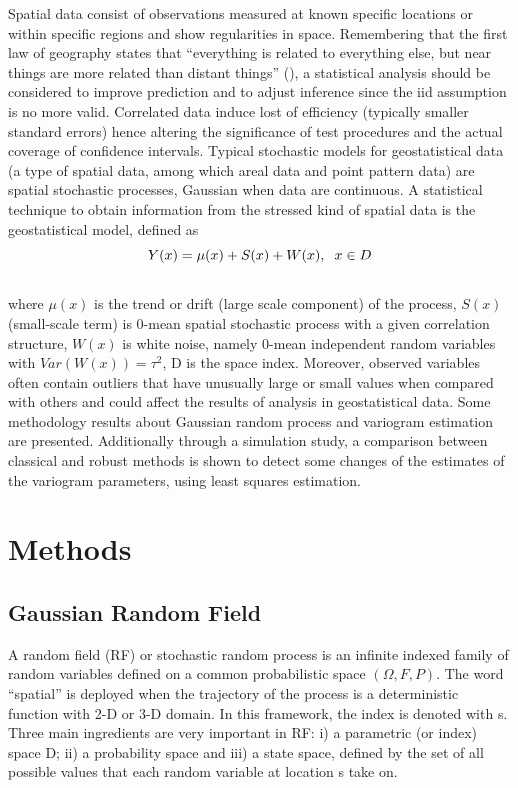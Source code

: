 \documentclass[
  12pt]{article}
\begin{document}
Spatial data consist of observations measured at known specific
locations or within specific regions and show regularities in space.
Remembering that the first law of geography states that ``everything is
related to everything else, but near things are more related than
distant things'' (\citet{tob:1969}), a statistical analysis should be
considered to improve prediction and to adjust inference since the iid
assumption is no more valid. Correlated data induce lost of efficiency
(typically smaller standard errors) hence altering the significance of
test procedures and the actual coverage of confidence intervals. Typical
stochastic models for geostatistical data (a type of spatial data, among
which areal data and point pattern data) are spatial stochastic
processes, Gaussian when data are continuous. A statistical technique to
obtain information from the stressed kind of spatial data is the
geostatistical model, defined as\\
\[Y(x)=\mu(x)+S(x)+W(x), \hspace{2mm} x\in D\]\\
where \(\mu(x)\) is the trend or drift (large scale component) of the
process, \(S(x)\) (small-scale term) is 0-mean spatial stochastic
process with a given correlation structure, \(W(x)\) is white noise,
namely 0-mean independent random variables with \(Var(W(x))=\tau^2\), D
is the space index. Moreover, observed variables often contain outliers
that have unusually large or small values when compared with others and
could affect the results of analysis in geostatistical data. Some
methodology results about Gaussian random process and variogram
estimation are presented. Additionally through a simulation study, a
comparison between classical and robust methods is shown to detect some
changes of the estimates of the variogram parameters, using least
squares estimation.

\section{Methods}\label{methods}

\subsection{Gaussian Random Field}\label{gaussian-random-field}

A random field (RF) or stochastic random process is an infinite indexed
family of random variables defined on a common probabilistic space
\((\Omega,F,P)\). The word ``spatial'' is deployed when the trajectory
of the process is a deterministic function with 2-D or 3-D domain. In
this framework, the index is denoted with s. Three main ingredients are
very important in RF: i) a parametric (or index) space D; ii) a
probability space and iii) a state space, defined by the set of all
possible values that each random variable at location s take on.
\end{document}

